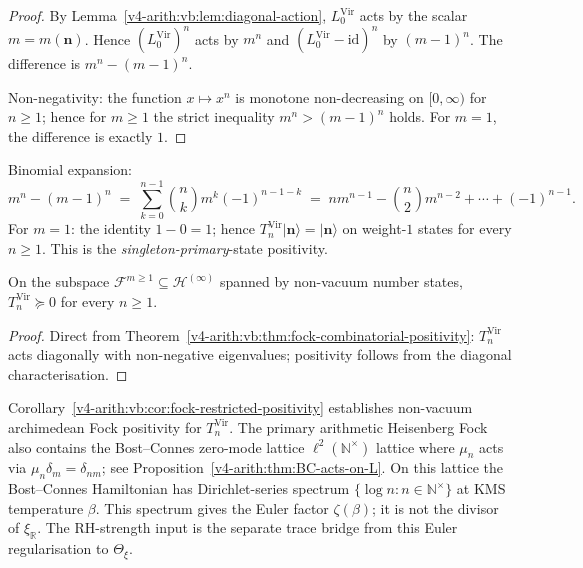 \begin{proof}
By Lemma~\ref{v4-arith:vb:lem:diagonal-action}, \(L_{0}^{\mathrm{Vir}}\) acts
by the scalar \(m=m(\mathbf{n})\). Hence \((L_{0}^{\mathrm{Vir}})^{n}\)
acts by \(m^{n}\) and \((L_{0}^{\mathrm{Vir}}-\mathrm{id})^{n}\) by
\((m-1)^{n}\). The difference is \(m^{n}-(m-1)^{n}\).

Non-negativity: the function \(x\mapsto x^{n}\) is monotone
non-decreasing on \([0,\infty)\) for \(n\geq 1\); hence for \(m\geq 1\) the
strict inequality \(m^{n}>(m-1)^{n}\) holds. For \(m=1\),
the difference is exactly \(1\).
\end{proof}

\begin{remark}
\label{v4-arith:vb:rem:combinatorial-expansion}
Binomial expansion:
\begin{equation}
m^{n}-(m-1)^{n}\;=\;\sum_{k=0}^{n-1}\binom{n}{k}m^{k}(-1)^{n-1-k}\;=\;nm^{n-1}-\binom{n}{2}m^{n-2}+\cdots+(-1)^{n-1}.
\end{equation}
For \(m=1\): the identity \(1-0=1\); hence
\(T_{n}^{\mathrm{Vir}}|\mathbf{n}\rangle=|\mathbf{n}\rangle\)
on weight-\(1\) states for every \(n\geq 1\). This is the
\emph{singleton-primary}-state positivity.
\end{remark}

\begin{corollary}
\label{v4-arith:vb:cor:fock-restricted-positivity}
On the subspace
\(\mathcal{F}^{m\geq 1}\subseteq\mathcal{H}^{(\infty)}\) spanned by
non-vacuum number states, \(T_{n}^{\mathrm{Vir}}\succeq 0\) for every \(n\geq 1\).
\end{corollary}

\begin{proof}
Direct from Theorem~\ref{v4-arith:vb:thm:fock-combinatorial-positivity}:
\(T_{n}^{\mathrm{Vir}}\) acts diagonally with non-negative eigenvalues; positivity
follows from the diagonal characterisation.
\end{proof}

\begin{remark}
\label{v4-arith:vb:rem:fock-closed-not}
Corollary~\ref{v4-arith:vb:cor:fock-restricted-positivity} establishes
non-vacuum archimedean Fock positivity for \(T_{n}^{\mathrm{Vir}}\).
The primary arithmetic Heisenberg Fock also contains the
Bost--Connes zero-mode lattice
\(\ell^{2}(\mathbb{N}^{\times})\)
lattice where \(\mu_{n}\) acts via
\(\mu_{n}\delta_{m}=\delta_{nm}\); see
Proposition~\ref{v4-arith:thm:BC-acts-on-L}. On this lattice the Bost--Connes
Hamiltonian has Dirichlet-series spectrum
\(\{\log n\colon n\in\mathbb{N}^{\times}\}\) at KMS temperature
\(\beta\). This spectrum gives the Euler factor
\(\zeta(\beta)\); it is not the divisor of
\(\xi_{\mathbb R}\).
The RH-strength input is the separate trace bridge from this Euler
regularisation to \(\Theta_{\xi}\).
\end{remark}

